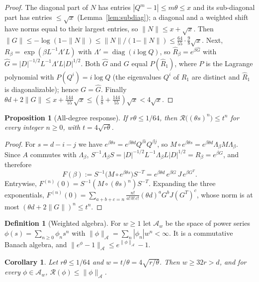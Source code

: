 \documentclass[11pt,a4paper]{article}
\numberwithin{equation}{section}
\newtheorem{proposition}[theorem]{Proposition}
\newtheorem{corollary}[theorem]{Corollary}
\theoremstyle{definition}
\newtheorem{definition}[theorem]{Definition}
\theoremstyle{remark}
\newcommand{\cA}{\mathcal A}
\newcommand{\cR}{\mathcal R}
\DeclareMathOperator{\diag}{diag}
\begin{document}
\begin{proof}
The diagonal part of $N$ has entries $|Q^m-1|\le m\theta\le x$ and its sub-diagonal part has entries $\le\sqrt x$
(Lemma~\ref{lem:subdiag}); a diagonal and a weighted shift have norms equal to their largest entries, so
$\|N\|\le x+\sqrt x$. Then $\|G\|\le-\log(1-\|N\|)\le\|N\|/(1-\|N\|)\le\frac{64}{55}\cdot\frac98\sqrt x$.
Next, $R_\beta=\exp(\beta L^{-1}\Lambda' L)$ with $\Lambda'=\diag(i\log Q)$, so $\widehat R_\beta=e^{\beta\widehat G}$ with
$\widehat G=|D|^{-1/2}L^{-1}\Lambda'L|D|^{1/2}$. Both $\widehat G$ and $G$ equal $P(\widehat R_1)$, where $P$ is the
Lagrange polynomial with $P(Q^i)=i\log Q$ (the eigenvalues $Q^i$ of $\widehat R_1$ are distinct and $\widehat R_1$ is
diagonalizable); hence $G=\widehat G$. Finally $\theta d+2\|G\|\le x+\frac{144}{55}\sqrt x\le(\frac18+\frac{144}{55})\sqrt x<4\sqrt x$.
\end{proof}

\begin{proposition}[All-degree response]\label{prop:response}
If $r\theta\le1/64$, then $\cR\big((\theta s)^n\big)\le t^n$ for every integer $n\ge0$, with $t=4\sqrt{r\theta}$.
\end{proposition}

\begin{proof}
For $s=d-i-j$ we have $e^{\beta\theta s}=e^{\beta\theta d}Q^{\beta i}Q^{\beta j}$, so
$M\circ e^{\beta\theta s}=e^{\beta\theta d}\Lambda_\beta M\Lambda_\beta$. Since $A$ commutes with $\Lambda_\beta$,
$S^{-1}\Lambda_\beta S=|D|^{-1/2}L^{-1}\Lambda_\beta L|D|^{1/2}=\widehat R_\beta=e^{\beta G}$, and therefore
\[
F(\beta):=S^{-1}\big(M\circ e^{\beta\theta s}\big)S^{-T}=e^{\beta\theta d}\,e^{\beta G}\,J\,e^{\beta G^T}.
\]
Entrywise, $F^{(n)}(0)=S^{-1}(M\circ(\theta s)^n)S^{-T}$. Expanding the three exponentials,
$F^{(n)}(0)=\sum_{a+b+c=n}\frac{n!}{a!\,b!\,c!}(\theta d)^aG^bJ(G^T)^c$, whose norm is at most $(\theta d+2\|G\|)^n\le t^n$.
\end{proof}

\begin{definition}[Weighted algebra]
For $w\ge1$ let $\cA_w$ be the space of power series $\phi(s)=\sum_{n\ge0}\phi_ns^n$ with
$\|\phi\|_{\cA}=\sum_n|\phi_n|w^n<\infty$. It is a commutative Banach algebra, and
$\|e^\phi-1\|_{\cA}\le e^{\|\phi\|_\cA}-1$.
\end{definition}

\begin{corollary}\label{cor:calculus}
Let $r\theta\le1/64$ and $w=t/\theta=4\sqrt{r/\theta}$. Then $w\ge32r>d$, and for every $\phi\in\cA_w$,
$\cR(\phi)\le\|\phi\|_{\cA}$.
\end{corollary}
\end{document}
